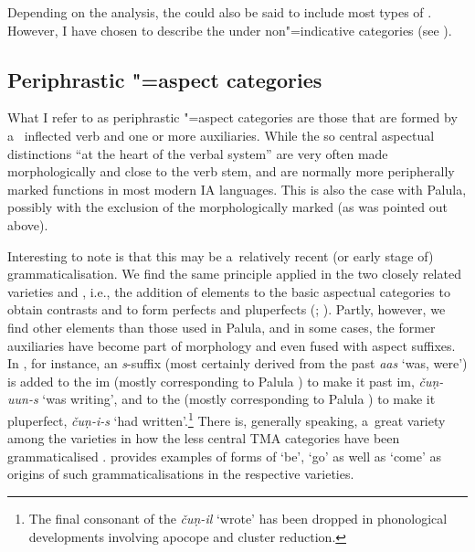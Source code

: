 Depending on the analysis, the  could also be said to include most types of . However, I have chosen to describe the  under non"=indicative categories (see ).


\subsection{Periphrastic "=aspect categories}
\label{subsec:9-1-5}

What I refer to as periphrastic "=aspect categories are those that are formed by a~ inflected verb and one or more auxiliaries. While the so central aspectual distinctions ``at the heart of the \iliNIA verbal system'' \citep[262]{masica1991} are very often made morphologically and close to the verb stem,  and  are normally more peripherally marked functions in most modern IA languages. This is also the case with Palula, possibly with the exclusion of the morphologically marked  (as was pointed out above). 



Interesting to note is that this may be a~relatively recent (or early stage of) grammaticalisation. We find the same principle applied in the two closely related varieties \iliSauji and \iliKalkoti, i.e., the addition of elements to the basic aspectual categories to obtain  contrasts and to form perfects and pluperfects (\citealt[48--55]{buddruss1967}; \citealt[48--53]{liljegren2009}). Partly, however, we find other elements than those used in Palula, and in some cases, the former auxiliaries have become part of  morphology and even fused with aspect suffixes. In \iliKalkoti, for instance, an \textit{s}-suffix (most certainly derived from the past  \textit{aas} `was, were') is added to the im (mostly corresponding to Palula ) to make it past im, \textit{čuṇ-uun-s} `was writing', and to the  (mostly corresponding to Palula ) to make it pluperfect, \textit{čuṇ-i-s} `had written'.\footnote{The final consonant of the  \textit{čuṇ-il} `wrote' has been dropped in phonological developments involving apocope and cluster reduction.} There is, generally speaking, a~great variety among the \iliShina varieties in how the less central TMA categories have been grammaticalised \citep[144--156]{liljegren2013}. \citet[38]{schmidt2004} provides examples of forms of `be', `go' as well as `come' as origins of such grammaticalisations in the respective varieties. 



